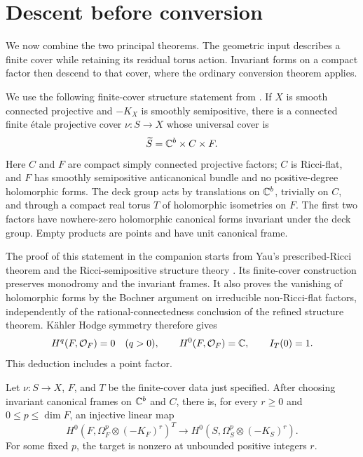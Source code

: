 \section{Descent before conversion}
\label{sec:descent}

We now combine the two principal theorems. The geometric input describes
a finite cover while retaining its residual torus action. Invariant forms
on a compact factor then descend to that cover, where the ordinary
conversion theorem applies.

We use the following finite-cover structure statement from
\cite[Theorem~(Finite cover with compact torus monodromy)]{CompanionH}. If \(X\) is smooth
connected projective and \(-K_X\) is smoothly semipositive, there is
a connected finite \'etale projective cover
\(\nu:S\to X\) whose universal cover is
\[
\widetilde S=\mathbb C^b\times C\times F.
\]
Here \(C\) and \(F\) are compact simply connected projective factors;
\(C\) is Ricci-flat, and \(F\) has smoothly semipositive anticanonical
bundle and no positive-degree holomorphic forms. The deck group acts by
translations on \(\mathbb C^b\), trivially on \(C\), and through a compact
real torus \(T\) of holomorphic isometries on \(F\). The first two
factors have nowhere-zero holomorphic canonical forms invariant under
the deck group. Empty products are points and have unit canonical frame.

The proof of this statement in the companion starts from Yau's
prescribed-Ricci theorem and the Ricci-semipositive structure theory
\cite{Yau1978,DPS1996,CDP2015}. Its finite-cover construction preserves
monodromy and the invariant frames. It also proves the vanishing of
holomorphic forms by the Bochner argument on irreducible
non-Ricci-flat factors, independently of the rational-connectedness
conclusion of the refined structure theorem. K\"ahler Hodge symmetry
therefore gives
\begin{equation}\label{eq:factor-euler}
H^q(F,\mathcal O_F)=0\quad(q>0),\qquad H^0(F,\mathcal O_F)=\mathbb C,
\qquad I_T(0)=1.
\end{equation}
This deduction includes a point factor.

\begin{proposition}\label{prop:descent}
Let \(\nu:S\to X\), \(F\), and \(T\) be the finite-cover data just
specified. After choosing invariant canonical frames on \(\mathbb C^b\) and
\(C\), there is, for every \(r\ge0\) and \(0\le p\le\dim F\), an
injective linear map
\[
H^0(F,\Omega_F^p\otimes(-K_F)^r)^T
\longrightarrow H^0(S,\Omega_S^p\otimes(-K_S)^r).
\]
For some fixed \(p\), the target is nonzero at unbounded positive
integers \(r\).
\end{proposition}

